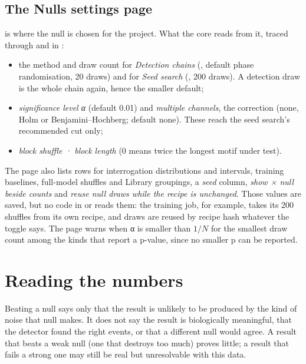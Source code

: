 
\subsection{The Nulls settings page}
 is where the null is chosen for the project. What the core reads from
it, traced through  and  in
:
\begin{itemize}
\item the method and draw count for \emph{Detection chains} (, default
  phase randomisation, 20 draws) and for \emph{Seed search} (, 200
  draws). A detection draw is the whole chain again, hence the smaller default;
\item \emph{significance level α} (default 0.01) and \emph{multiple channels}, the correction
  (none, Holm or Benjamini--Hochberg; default none). These reach the seed search's recommended
  cut only;
\item \emph{block shuffle · block length} (0 means twice the longest motif under test).
\end{itemize}
The page also lists rows for interrogation distributions and intervals, training baselines,
full-model shuffles and Library groupings, a \emph{seed} column, \emph{show × null beside
counts} and \emph{reuse null draws while the recipe is unchanged}. Those values are saved, but
no code in  or  reads them: the training job, for example,
takes its 200 shuffles from its own recipe, and draws are reused by recipe hash whatever the
toggle says. The page warns when α is smaller than $1/N$ for the smallest draw count among the
kinds that report a p-value, since no smaller p can be reported.

\section{Reading the numbers}\label{sec:nulls-reading}
\begin{plainterms}
Beating a null says only that the result is unlikely to be produced by the kind of noise that
null makes. It does not say the result is biologically meaningful, that the detector found the
right events, or that a different null would agree. A result that beats a weak null (one that
destroys too much) proves little; a result that fails a strong one may still be real but
unresolvable with this data.
\end{plainterms}

